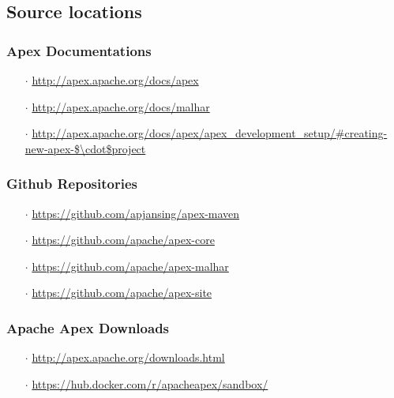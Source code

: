 \documentclass[final]{IEEEtran}
\begin{document}
\subsection{Source locations}

\subsubsection{Apex Documentations}\label{sec:apex-docs}
\begin{enumerate}
  \item[$\cdot$] \url{http://apex.apache.org/docs/apex}
  \item[$\cdot$] \url{http://apex.apache.org/docs/malhar}
  \item[$\cdot$] \url{http://apex.apache.org/docs/apex/apex_development_setup/#creating-new-apex-$\cdot$project}
\end{enumerate}

\subsubsection{Github Repositories}\label{sec:repos}
\begin{enumerate}
  \item[$\cdot$] \url{https://github.com/apjansing/apex-maven}
	\item[$\cdot$] \url{https://github.com/apache/apex-core}
	\item[$\cdot$] \url{https://github.com/apache/apex-malhar}
	\item[$\cdot$] \url{https://github.com/apache/apex-site}
\end{enumerate} 

\subsubsection{Apache Apex Downloads}\label{sec:apex-downloads}
\begin{enumerate}
	\item[$\cdot$] \url{http://apex.apache.org/downloads.html}
	\item[$\cdot$] \url{https://hub.docker.com/r/apacheapex/sandbox/}
\end{enumerate}
\end{document}
